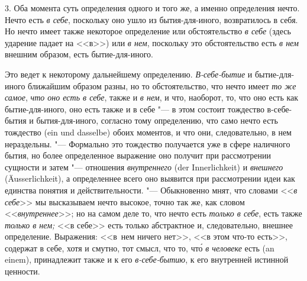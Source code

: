 3. Оба момента суть определения одного и того же, а именно определения
нечто. Нечто есть {\em в себе}, поскольку оно ушло из
бытия-для-иного, возвратилось в себя. Но нечто имеет также некоторое
определение или обстоятельство {\em в себе} (здесь
ударение падает на <<в>>) или {\em в нем}, поскольку это
обстоятельство есть {\em в нем} внешним образом, есть
бытие-для-иного.

Это ведет к некоторому дальнейшему определению.
{\em В-себе-бытие} и бытие-для-иного ближайшим
образом разны, но то обстоятельство, что нечто имеет
{\em то же самое}, {\em что оно
есть в себе}, также и {\em в нем}, и что, наоборот, то,
что оно есть как бытие-для-иного, оно есть также и в себе "--- в этом
состоит тождество в-себе-бытия и бытия-для-иного, согласно тому
определению, что само нечто есть тождество (ein und dasselbe) обоих
моментов, и что они, следовательно, в нем нераздельны. "--- Формально это
тождество получается уже в сфере наличного бытия, но более определенное
выражение оно получит при рассмотрении сущности и затем "--- отношения
{\em внутреннего} (der Innerlichkeit) и
{\em внешнего} (Äusserlichkeit), а определеннее всего
оно выявится при рассмотрении идеи как единства понятия и действительности.
"--- Обыкновенно мнят, что словами <<{\em в себе}>> мы
высказываем нечто высокое, точно так же, как словом
<<{\em внутреннее}>>; но на самом деле то, что нечто есть
{\em только в себе}, есть также {\em только в нем;} <<в себе>> есть только
абстрактное и, следовательно, внешнее определение. Выражения: <<в~нем
ничего нет>>, <<в этом что-то есть>>, содержат в себе, хотя и смутно, тот
смысл, что то, чт\'{о} {\em в человеке} есть (an einem), принадлежит также
и к его {\em в-себе-бытию}, к его внутренней истинной ценности.

